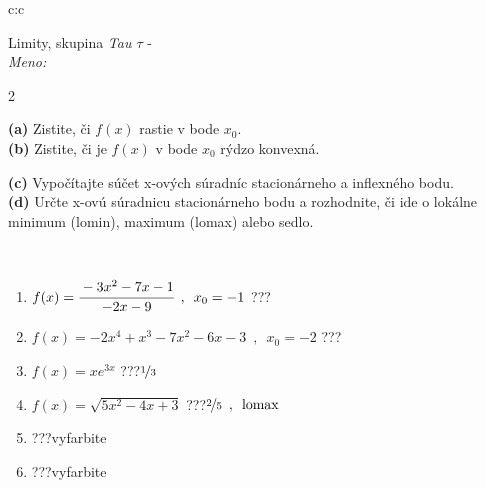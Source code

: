 \documentclass[10pt]{report}
\begin{document}
\begin{tabular}{c:c}
\begin{minipage}[c][104.5mm][t]{0.5\linewidth}
\begin{center}
\vspace{7mm}
{\huge Limity, skupina \textit{Tau $\tau$} -}\\[5mm]
\textit{Meno:}\phantom{xxxxxxxxxxxxxxxxxxxxxxxxxxxxxxxxxxxxxxxxxxxxxxxxxxxxxxxxxxxxxxxxx}\\[5mm]
\begin{minipage}{0.95\linewidth}
\begin{center}
{\small \begin{multicols}{2} \raggedright
\textbf{(a)} Zistite, či \(f(x)\) rastie v bode \(x_0\). \\[1mm]
\textbf{(b)} Zistite, či je \(f(x)\) v bode \(x_0\) rýdzo konvexná. \par \columnbreak
\textbf{(c)} Vypočítajte súčet x-ových súradníc stacionárneho a inflexného bodu. \\[1mm]
\textbf{(d)} Určte x-ovú súradnicu stacionárneho bodu a rozhodnite, či ide o lokálne minimum (lomin), maximum (lomax) alebo sedlo. \\[1mm]
\end{multicols}
}
\end{center}
\end{minipage}
\\[4mm]
\begin{minipage}{0.79\linewidth}
\begin{center}
\begin{varwidth}{\linewidth}
\begin{enumerate}
\normalsize
\item $f(x)=\cfrac{-3x^2-7x-1}{-2x-9}\enspace , \enspace x_0=-1$\quad \dotfill\; ???\;\dotfill \quad {}
\item $f(x)=-2x^4+x^3-7x^2-6x-3\enspace , \enspace x_0=-2$\quad \dotfill\; ???\;\dotfill \quad {}
\item $f(x)=xe^{3x}$\quad \dotfill\; ???\;\dotfill \quad $\nicefrac{1}{3}$
\item $f(x)=\sqrt{5x^2-4x+3}$\quad \dotfill\; ???\;\dotfill \quad $\nicefrac{2}{5}\enspace , \enspace\text{lomax}$
\item \quad \dotfill\; ???\;\dotfill \quad vyfarbite
\item \quad \dotfill\; ???\;\dotfill \quad vyfarbite
\end{enumerate}
\end{varwidth}
\end{center}

\end{minipage}
\end{center}
\end{minipage}
\end{tabular}
\end{document}
